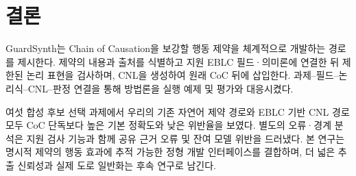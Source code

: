 \documentclass[10pt,a4paper,twocolumn]{article}\usepackage[margin=18mm]{geometry}\usepackage{fontspec,kotex}
\begin{document}
\section{결론}

GuardSynth는 Chain of Causation을 보강할 행동 제약을 체계적으로 개발하는 경로를 제시한다. 제약의 내용과 출처를 식별하고 지원 EBLC 필드·의미론에 연결한 뒤 제한된 논리 표현을 검사하며, CNL을 생성하여 원래 CoC 뒤에 삽입한다. 과제--필드--논리식--CNL--판정 연결을 통해 방법론을 실행 예제 및 평가와 대응시켰다.\par

여섯 합성 후보 선택 과제에서 우리의 기존 자연어 제약 경로와 EBLC 기반 CNL 경로 모두 CoC 단독보다 높은 기본 정확도와 낮은 위반율을 보였다. 별도의 오류·경계 분석은 지원 검사 기능과 함께 공유 근거 오류 및 잔여 모델 위반을 드러냈다. 본 연구는 명시적 제약의 행동 효과에 추적 가능한 정형 개발 인터페이스를 결합하며, 더 넓은 추출 신뢰성과 실제 도로 일반화는 후속 연구로 남긴다.\par
\end{document}
